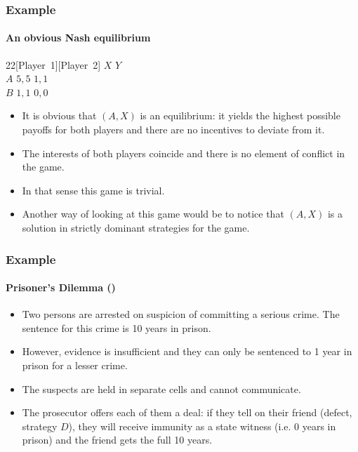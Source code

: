 \documentclass[10pt]{beamer}
\theoremstyle{definition}
\begin{document}
\begin{frame}[fragile]
\frametitle{Example }
\framesubtitle{An obvious Nash equilibrium}

\begin{center}
\begin{game}{2}{2}[Player~1][Player~2]
 \> $ X $ \> $ Y $ \\
$ A $ \> $ 5,5 $ \> $ 1,1 $ \\
$ B $ \> $ 1,1 $ \> $ 0,0 $
\end{game}
\end{center}\bigskip

\begin{itemize}\itemsep1em
\item It is obvious that $ (A,X) $ is an equilibrium: it yields the highest possible payoffs for both players and there are no incentives to deviate from it.
\item The interests of both players coincide and there is no element of conflict in the game.
\item In that sense this game is trivial.
\item Another way of looking at this game would be to notice that $ (A,X) $ is a solution in strictly dominant strategies for the game.
\end{itemize}
\end{frame}



\begin{frame}[fragile]\setcounter{slidenum}{1}
\frametitle{Example }
\framesubtitle{Prisoner's Dilemma ()}
\begin{itemize}\itemsep1em
\item Two persons are arrested on suspicion of committing a serious crime. The sentence for this crime is 10 years in prison.
\item However, evidence is insufficient and they can only be sentenced to 1 year in prison for a lesser crime.
\item The suspects are held in separate cells and cannot communicate.
\item The prosecutor offers each of them a deal: if they tell on their friend (defect, strategy $ D $), they will receive immunity as a state witness (i.e. 0 years in prison) and the friend gets the full 10 years.
\end{itemize}
\end{frame}
\end{document}
